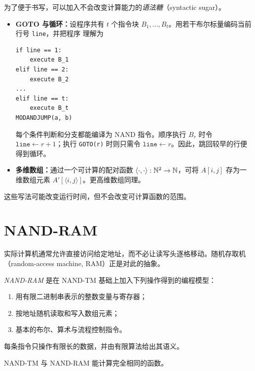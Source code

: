为了便于书写，可以加入不会改变计算能力的\emph{语法糖}（syntactic sugar）。

\begin{itemize}
  \item \textbf{GOTO 与循环：}设程序共有 $t$ 个指令块
    $B_1,\ldots,B_t$。用若干布尔标量编码当前行号 \texttt{line}，并把程序
    理解为

\begin{verbatim}
if line == 1:
    execute B_1
elif line == 2:
    execute B_2
...
elif line == t:
    execute B_t
MODANDJUMP(a, b)
\end{verbatim}

    每个条件判断和分支都能编译为 NAND 指令。顺序执行 $B_r$ 时令
    $\texttt{line}\gets r+1$；执行 \texttt{GOTO(r)} 时则只需令
    $\texttt{line}\gets r$。因此，跳回较早的行便得到循环。
  \item \textbf{多维数组：}通过一个可计算的配对函数
    $\langle\cdot,\cdot\rangle:\mathbb{N}^2\to\mathbb{N}$，可将
    $A[i,j]$ 存为一维数组元素 $A'[\langle i,j\rangle]$。更高维数组同理。
\end{itemize}

这些写法可能改变运行时间，但不会改变可计算函数的范围。

\section{NAND-RAM}

实际计算机通常允许直接访问给定地址，而不必让读写头逐格移动。随机存取机
（random-access machine, RAM）正是对此的抽象。

\begin{definition}
  \label{def:nand-ram}
  \emph{NAND-RAM} 是在 NAND-TM 基础上加入下列操作得到的编程模型：

  \begin{enumerate}[label=\arabic*.]
    \item 用有限二进制串表示的整数变量与寄存器；
    \item 按地址随机读取和写入数组元素；
    \item 基本的布尔、算术与流程控制指令。
  \end{enumerate}

  每条指令只操作有限长的数据，并由有限算法给出其语义。
\end{definition}

\begin{theorem}
  \label{thm:nand-tm-nand-ram-equivalence}
  NAND-TM 与 NAND-RAM 能计算完全相同的函数。
\end{theorem}

